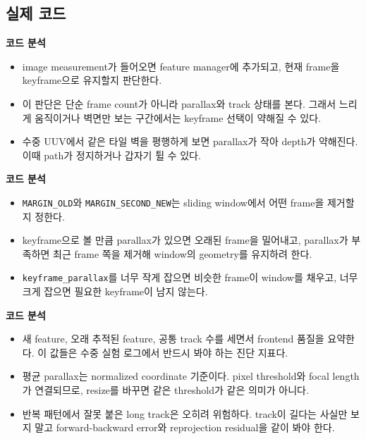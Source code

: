 \documentclass[11pt,a4paper]{article}
\newcommand{\code}[1]{\texttt{#1}}
\newcommand{\codeheading}[1]{\par\vspace{6pt}\noindent{\footnotesize\bfseries\textcolor{codeemph}{#1}}\par\vspace{2pt}}
\newcommand{\readpoint}[1]{\par\noindent{\footnotesize\textcolor{muted}{읽는 포인트: #1}}\par\vspace{2pt}}
\newenvironment{codeanalysis}{%
  \par\vspace{2pt}\noindent
  {\footnotesize\bfseries\textcolor{accentblue}{코드 분석}}\par
  \begin{itemize}[leftmargin=1.35em,topsep=2pt,itemsep=1pt,parsep=0pt]
  \footnotesize
}{%
  \end{itemize}
  \vspace{6pt}
}
\begin{document}
\subsection*{실제 코드}

\readpoint{feature manager가 새 frame을 keyframe으로 볼지 판단하고, 그 결과가 marginalization 방향으로 이어진다.}
\codeheading{estimator.cpp:270--319}

\begin{codeanalysis}
  \item image measurement가 들어오면 feature manager에 추가되고, 현재 frame을 keyframe으로 유지할지 판단한다.
  \item 이 판단은 단순 frame count가 아니라 parallax와 track 상태를 본다. 그래서 느리게 움직이거나 벽면만 보는 구간에서는 keyframe 선택이 약해질 수 있다.
  \item 수중 UUV에서 같은 타일 벽을 평행하게 보면 parallax가 작아 depth가 약해진다. 이때 path가 정지하거나 갑자기 튈 수 있다.
\end{codeanalysis}

\codeheading{estimator.cpp:411--426}

\begin{codeanalysis}
  \item \code{MARGIN\_OLD}와 \code{MARGIN\_SECOND\_NEW}는 sliding window에서 어떤 frame을 제거할지 정한다.
  \item keyframe으로 볼 만큼 parallax가 있으면 오래된 frame을 밀어내고, parallax가 부족하면 최근 frame 쪽을 제거해 window의 geometry를 유지하려 한다.
  \item \code{keyframe\_parallax}를 너무 작게 잡으면 비슷한 frame이 window를 채우고, 너무 크게 잡으면 필요한 keyframe이 남지 않는다.
\end{codeanalysis}

\codeheading{feature\_manager.cpp:52--118}

\begin{codeanalysis}
  \item 새 feature, 오래 추적된 feature, 공통 track 수를 세면서 frontend 품질을 요약한다. 이 값들은 수중 실험 로그에서 반드시 봐야 하는 진단 지표다.
  \item 평균 parallax는 normalized coordinate 기준이다. pixel threshold와 focal length가 연결되므로, resize를 바꾸면 같은 threshold가 같은 의미가 아니다.
  \item 반복 패턴에서 잘못 붙은 long track은 오히려 위험하다. track이 길다는 사실만 보지 말고 forward-backward error와 reprojection residual을 같이 봐야 한다.
\end{codeanalysis}
\end{document}
